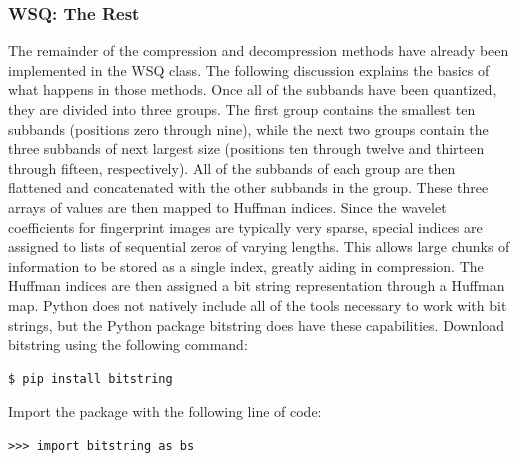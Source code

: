 \subsubsection*{WSQ: The Rest}
The remainder of the compression and decompression methods have already been implemented in the WSQ class.
The following discussion explains the basics of what happens in those methods.
Once all of the subbands have been quantized, they are divided into three groups.
The first group contains the smallest ten subbands (positions zero through nine), while the next two groups contain the three subbands of next largest size (positions ten through twelve and
thirteen through fifteen, respectively).
All of the subbands of each group are then flattened and concatenated with the other subbands in the group.
These three arrays of values are then mapped to Huffman indices.
Since the wavelet coefficients for fingerprint images are typically very sparse, special indices are assigned to lists of sequential zeros of varying lengths.
This allows large chunks of information to be stored as a single index, greatly aiding in compression.
The Huffman indices are then assigned a bit string representation through a Huffman map.
Python does not natively include all of the tools necessary to work with bit strings, but the Python package bitstring does have these capabilities.
Download bitstring using the following command:
\begin{lstlisting}
$ pip install bitstring
\end{lstlisting}
Import the package with the following line of code:
\begin{lstlisting}
>>> import bitstring as bs
\end{lstlisting}


